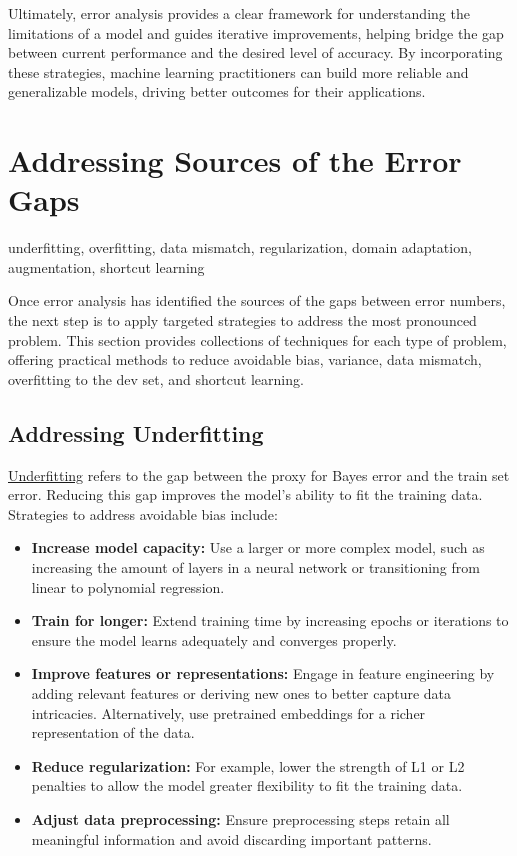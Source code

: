 \documentclass[12pt,openany]{book}
\begin{document}
Ultimately, error analysis provides a clear framework for understanding the limitations of a model and guides iterative improvements, helping bridge the gap between current performance and the desired level of accuracy. By incorporating these strategies, machine learning practitioners can build more reliable and generalizable models, driving better outcomes for their applications.



\section{Addressing Sources of the Error Gaps} \label{sec:addressing_sources_error_gaps}

\begin{keywordsbox}
underfitting, overfitting, data mismatch, regularization, domain adaptation, augmentation, shortcut learning
\end{keywordsbox}

Once error analysis has identified the sources of the gaps between error numbers, the next step is to apply targeted strategies to address the most pronounced problem. This section provides collections of techniques for each type of problem, offering practical methods to reduce avoidable bias, variance, data mismatch, overfitting to the dev set, and shortcut learning.

\subsection{Addressing Underfitting}

\hyperref[subsec:underfitting]{Underfitting} refers to the gap between the proxy for Bayes error and the train set error. Reducing this gap improves the model’s ability to fit the training data. Strategies to address avoidable bias include:

\begin{itemize}
    \item \textbf{Increase model capacity:} Use a larger or more complex model, such as increasing the amount of layers in a neural network or transitioning from linear to polynomial regression.
    \item \textbf{Train for longer:} Extend training time by increasing epochs or iterations to ensure the model learns adequately and converges properly.
    \item \textbf{Improve features or representations:} Engage in feature engineering by adding relevant features or deriving new ones to better capture data intricacies. Alternatively, use pretrained embeddings for a richer representation of the data.
    \item \textbf{Reduce regularization:} For example, lower the strength of L1 or L2 penalties to allow the model greater flexibility to fit the training data.
    \item \textbf{Adjust data preprocessing:} Ensure preprocessing steps retain all meaningful information and avoid discarding important patterns.
\end{itemize}
\end{document}
